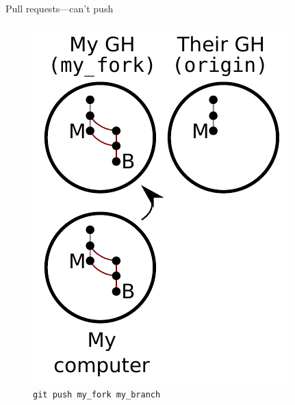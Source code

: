 \begin{frame}{Pull requests---can't push}
  \begin{figure}
    \includegraphics{fork_012.pdf}
    \\ \texttt{git push my\_fork my\_branch}
    \\ \texttt{}
  \end{figure}
\end{frame}


